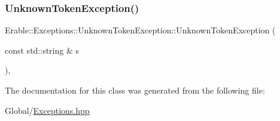 \subsubsection{\texorpdfstring{UnknownTokenException()}{UnknownTokenException()}}
{\footnotesize\ttfamily Erable\+::\+Exceptions\+::\+Unknown\+Token\+Exception\+::\+Unknown\+Token\+Exception (\begin{DoxyParamCaption}\item[{const std\+::string \&}]{s }\end{DoxyParamCaption})\hspace{0.3cm}{\ttfamily [inline]}, {\ttfamily [explicit]}}



The documentation for this class was generated from the following file\+:\begin{DoxyCompactItemize}
\item 
Global/\mbox{\hyperlink{_exceptions_8hpp}{Exceptions.\+hpp}}\end{DoxyCompactItemize}
